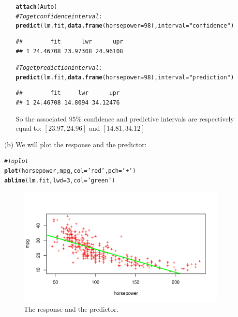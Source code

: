 \documentclass[a4paper, 10pt]{scrartcl}\usepackage[]{graphicx}\usepackage[]{color}
\makeatletter
\def\maxwidth{ %
  \ifdim\Gin@nat@width>\linewidth
    \linewidth
  \else
    \Gin@nat@width
  \fi
}
\newcommand{\hlnum}[1]{\textcolor[rgb]{0.686,0.059,0.569}{#1}}%
\newcommand{\hlstr}[1]{\textcolor[rgb]{0.192,0.494,0.8}{#1}}%
\newcommand{\hlcom}[1]{\textcolor[rgb]{0.678,0.584,0.686}{\textit{#1}}}%
\newcommand{\hlstd}[1]{\textcolor[rgb]{0.345,0.345,0.345}{#1}}%
\newcommand{\hlkwc}[1]{\textcolor[rgb]{0.333,0.667,0.333}{#1}}%
\newcommand{\hlkwd}[1]{\textcolor[rgb]{0.737,0.353,0.396}{\textbf{#1}}}%
\newenvironment{kframe}{%
 \def\at@end@of@kframe{}%
 \ifinner\ifhmode%
  \def\at@end@of@kframe{\end{minipage}}%
  \begin{minipage}{\columnwidth}%
 \fi\fi%
 \def\FrameCommand##1{\hskip\@totalleftmargin \hskip-\fboxsep
 \colorbox{shadecolor}{##1}\hskip-\fboxsep
     \hskip-\linewidth \hskip-\@totalleftmargin \hskip\columnwidth}%
 \MakeFramed {\advance\hsize-\width
   \@totalleftmargin\z@ \linewidth\hsize
   \@setminipage}}%
 {\par\unskip\endMakeFramed%
 \at@end@of@kframe}
\newenvironment{knitrout}{}{} %
\makeatother
\begin{document}
\begin{itemize}
\begin{itemize}
\begin{knitrout}
\color{fgcolor}\begin{kframe}
\begin{alltt}
\hlkwd{attach}\hlstd{(Auto)}
\hlcom{#To get confidence interval:}
\hlkwd{predict}\hlstd{(lm.fit,} \hlkwd{data.frame}\hlstd{(}\hlkwc{horsepower}\hlstd{=}\hlnum{98}\hlstd{),} \hlkwc{interval}\hlstd{=}\hlstr{"confidence"}\hlstd{)}
\end{alltt}
\begin{verbatim}
##        fit      lwr      upr
## 1 24.46708 23.97308 24.96108
\end{verbatim}
\begin{alltt}
\hlcom{#To get prediction interval:}
\hlkwd{predict}\hlstd{(lm.fit,} \hlkwd{data.frame}\hlstd{(}\hlkwc{horsepower}\hlstd{=}\hlnum{98}\hlstd{),} \hlkwc{interval}\hlstd{=}\hlstr{"prediction"}\hlstd{)}
\end{alltt}
\begin{verbatim}
##        fit     lwr      upr
## 1 24.46708 14.8094 34.12476
\end{verbatim}
\end{kframe}
\end{knitrout}
				So the associated $95\%$ confidence and
				predictive intervals are respectively
				equal to: $[23.97, 24.96]$ and $[14.81,
				34.12]$
		\end{itemize}
	\item[(b)] We will plot the response and the predictor:
\begin{knitrout}
\color{fgcolor}\begin{kframe}
\begin{alltt}
\hlcom{#To plot }
\hlkwd{plot}\hlstd{(horsepower, mpg,} \hlkwc{col}\hlstd{=}\hlstr{'red'}\hlstd{,} \hlkwc{pch}\hlstd{=}\hlstr{'+'}\hlstd{)}
\hlkwd{abline}\hlstd{(lm.fit,} \hlkwc{lwd}\hlstd{=}\hlnum{3}\hlstd{,} \hlkwc{col}\hlstd{=}\hlstr{'green'}\hlstd{)}
\end{alltt}
\end{kframe}\begin{figure}[H]
\includegraphics[width=\maxwidth]{figure/p1b-1} \caption[The response and the predictor]{The response and the predictor.}\label{fig:p1b}
\end{figure}



\end{knitrout}
\end{itemize}
\end{document}
